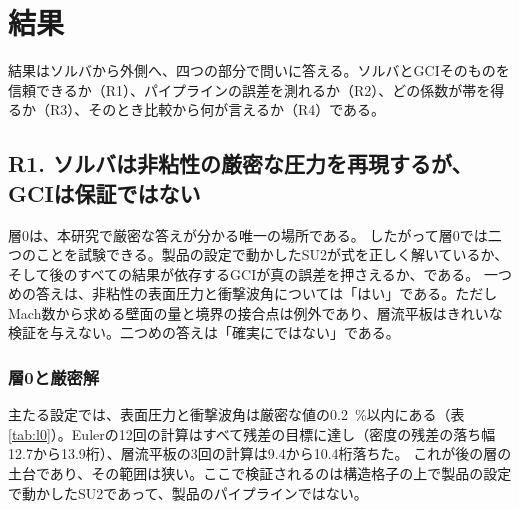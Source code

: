 \documentclass[twocolumn]{labreport}
\begin{document}
\section{結果}
\label{sec:results}

結果はソルバから外側へ、四つの部分で問いに答える。ソルバとGCIそのものを信頼できるか（R1）、パイプラインの誤差を測れるか（R2）、どの係数が帯を得るか（R3）、そのとき比較から何が言えるか（R4）である。

\subsection{R1. ソルバは非粘性の厳密な圧力を再現するが、GCIは保証ではない}
\label{sec:r1}

層0は、本研究で厳密な答えが分かる唯一の場所である。
したがって層0では二つのことを試験できる。製品の設定で動かしたSU2が式を正しく解いているか、そして後のすべての結果が依存するGCIが真の誤差を押さえるか、である。
一つめの答えは、非粘性の表面圧力と衝撃波角については「はい」である。ただしMach数から求める壁面の量と境界の接合点は例外であり、層流平板はきれいな検証を与えない。二つめの答えは「確実にではない」である。

\subsubsection{層0と厳密解}
\label{sec:l0results}

主たる設定では、表面圧力と衝撃波角は厳密な値の0.2~\%以内にある（表\ref{tab:l0}）。Eulerの12回の計算はすべて残差の目標に達し（密度の残差の落ち幅12.7から13.9桁）、層流平板の3回の計算は9.4から10.4桁落ちた。
これが後の層の土台であり、その範囲は狭い。ここで検証されるのは構造格子の上で製品の設定で動かしたSU2であって、製品のパイプラインではない。
\end{document}
